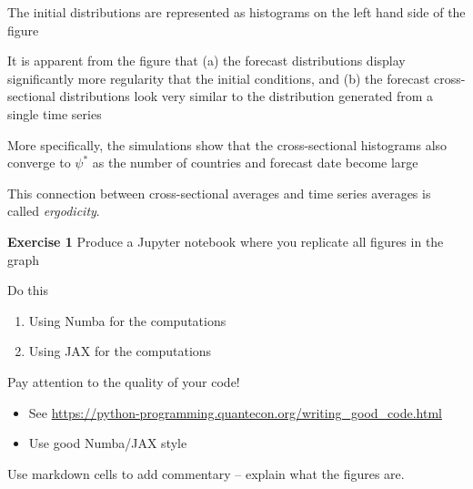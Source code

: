 \documentclass[xcolor=dvipsnames]{beamer}
\begin{document}
\begin{frame}
    
    The initial distributions are represented as histograms on the left hand side
    of the figure

    \medskip
    It is apparent from the figure that (a) the
    forecast distributions display significantly more regularity that the initial
    conditions, and (b) the forecast cross-sectional distributions look very
    similar to the distribution generated from a single time series

    \medskip
    More specifically, the simulations show that the cross-sectional histograms
    also converge to $\psi^*$ as the number of countries and forecast date
    become large


    \medskip
    This connection between cross-sectional averages and time series averages is
    called \emph{ergodicity}.

\end{frame}

\begin{frame}
    
    {\bf Exercise 1} Produce a Jupyter notebook where you replicate all figures
    in the graph

    \medskip
    Do this
    \begin{enumerate}
        \item Using Numba for the computations
        \item Using JAX for the computations
    \end{enumerate}

    Pay attention to the quality of your code!

    \medskip
    \begin{itemize}
        \item See \url{https://python-programming.quantecon.org/writing_good_code.html}
        \item Use good Numba/JAX style
    \end{itemize}


    Use markdown cells to add commentary -- explain what the figures are.

\end{frame}
\end{document}
